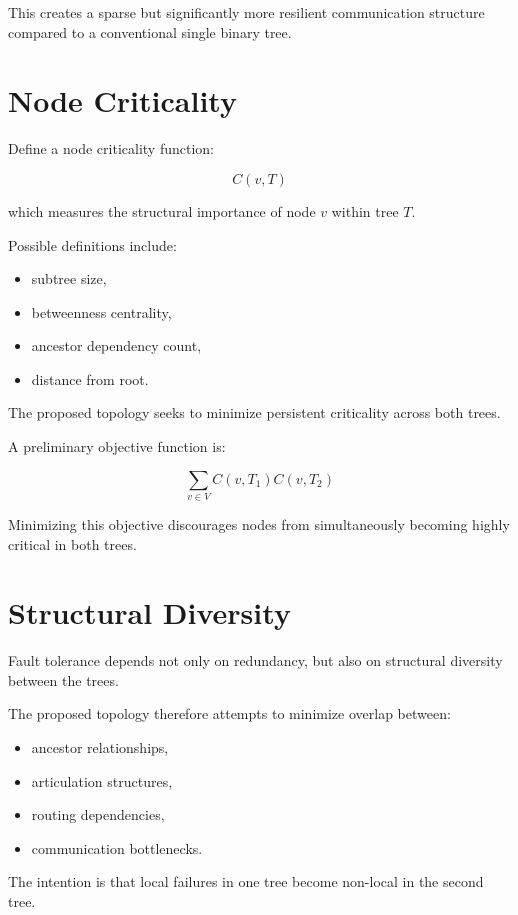 \documentclass[11pt]{article}
\begin{document}
This creates a sparse but significantly more resilient communication structure compared to a conventional single binary tree.

\section{Node Criticality}

Define a node criticality function:

\[
C(v,T)
\]

which measures the structural importance of node \(v\) within tree \(T\).

Possible definitions include:

\begin{itemize}
    \item subtree size,
    \item betweenness centrality,
    \item ancestor dependency count,
    \item distance from root.
\end{itemize}

The proposed topology seeks to minimize persistent criticality across both trees.

A preliminary objective function is:

\[
\sum_{v \in V}
C(v,T_1)C(v,T_2)
\]

Minimizing this objective discourages nodes from simultaneously becoming highly critical in both trees.

\section{Structural Diversity}

Fault tolerance depends not only on redundancy, but also on structural diversity between the trees.

The proposed topology therefore attempts to minimize overlap between:

\begin{itemize}
    \item ancestor relationships,
    \item articulation structures,
    \item routing dependencies,
    \item communication bottlenecks.
\end{itemize}

The intention is that local failures in one tree become non-local in the second tree.
\end{document}

